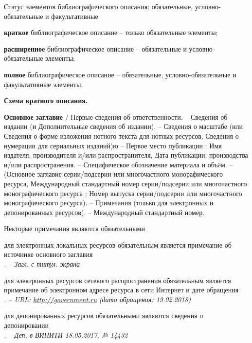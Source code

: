 Статус элементов библиографического описания: обязательные, условно-обязательные и факультативные

\begin{cutelist}
    \item \textbf{краткое} библиографическое описание -- только обязательные элементы;
    \item \textbf{расширенное} библиографическое описание -- обязательные и условно-обязательные элементы;
    \item \textbf{полное} библиографическое описание -- обязательные, условно-обязательные и факультативные элементы.
\end{cutelist}

\textbf{Схема кратного описания.}

\textbf{Основное заглавие} / Первые сведения об ответственности. -- Сведения об издании (и Дополнительные сведения об издании). -- Сведения о масштабе (или Сведения о форме изложения нотного текста для нотных ресурсов, Сведения о нумерации для сериальных изданий)ю -- Первое место публикации : Имя издателя, производителя и/или распространителя, Дата публикации, производства и/или распространения. -- Специфическое обозначение материала и объ\"eм. -- (Основное заглавие серии/подсерии или многочастного монорафического ресурса, Международный стандартный номер серии/подсерии или многочастного монографического ресурса ; Номер выпуска серии/подсерии или многочастного монографического ресурса). -- Примечания (только для электронных и депонированных ресурсов). -- Международный стандартный номер.

Некторые примечания являются обязательными

\begin{cutelist}
    \item для электронных локальных ресурсов обязательным является примечание об источнике основного заглавия\\
    \textsl{. -- Загл. с титул. экрана}
    \item для электронных ресурсов сетевого распространения обязательным является примечание об электронном адресе ресурса в сети Интернет и дате обращения\\
    \textsl{. -- URL: \underline{http://government.ru} (дата обращения: 19.02.2018)}
    \item для депонированных ресурсов обязательными являются сведения о депонировании\\
    \textsl{. -- Деп. в ВИНИТИ 18.05.2017, № 14432}
\end{cutelist}

